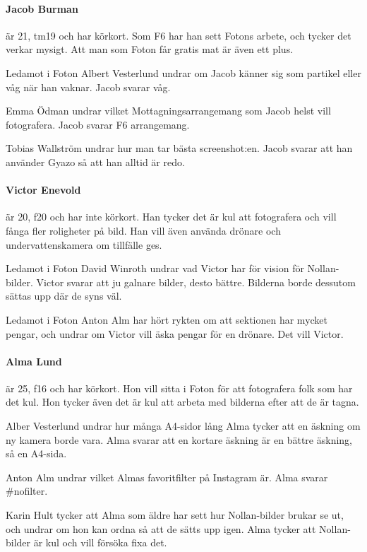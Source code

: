 \documentclass[hidelinks]{sektionsmote}
\begin{document}
\paragraph{Jacob Burman} är 21, tm19 och har körkort.
Som F6 har han sett Fotons arbete, och tycker det verkar mysigt.
Att man som Foton får gratis mat är även ett plus.

Ledamot i Foton Albert Vesterlund undrar om Jacob känner sig som partikel eller våg när han vaknar.
Jacob svarar våg.

Emma Ödman undrar vilket Mottagningsarrangemang som Jacob helst vill fotografera.
Jacob svarar F6 arrangemang.

Tobias Wallström undrar hur man tar bästa screenshot:en.
Jacob svarar att han använder Gyazo så att han alltid är redo.

\paragraph{Victor Enevold} är 20, f20 och har inte körkort.
Han tycker det är kul att fotografera och vill fånga fler roligheter på bild.
Han vill även använda drönare och undervattenskamera om tillfälle ges.

Ledamot i Foton David Winroth undrar vad Victor har för vision för Nollan-bilder.
Victor svarar att ju galnare bilder, desto bättre.
Bilderna borde dessutom sättas upp där de syns väl.

Ledamot i Foton Anton Alm har hört rykten om att sektionen har mycket pengar, och undrar om Victor vill äska pengar för en drönare.
Det vill Victor.

\paragraph{Alma Lund} är 25, f16 och har körkort.
Hon vill sitta i Foton för att fotografera folk som har det kul.
Hon tycker även det är kul att arbeta med bilderna efter att de är tagna.

Alber Vesterlund undrar hur många A4-sidor lång Alma tycker att en äskning om ny kamera borde vara.
Alma svarar att en kortare äskning är en bättre äskning, så en A4-sida.

Anton Alm undrar vilket Almas favoritfilter på Instagram är.
Alma svarar \#nofilter.

Karin Hult tycker att Alma som äldre har sett hur Nollan-bilder brukar se ut, och undrar om hon kan ordna så att de sätts upp igen.
Alma tycker att Nollan-bilder är kul och vill försöka fixa det.
\end{document}
